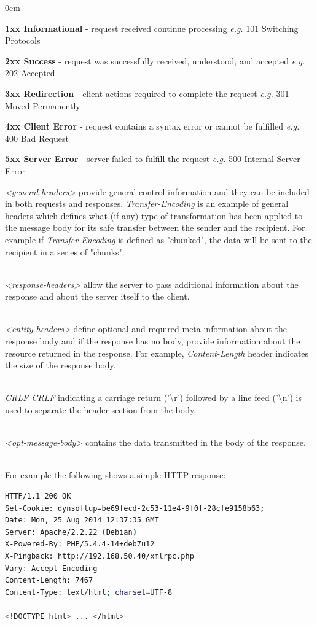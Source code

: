 \documentclass[a4paper,11pt,twoside]{report}
\begin{document}
\begin{list}{-}{}
\itemsep0em
\item \textbf{1xx Informational} - request received continue processing \textit{e.g.} 101 Switching Protocols
\item \textbf{2xx Success} - request was successfully received, understood, and accepted \textit{e.g.} 202 Accepted
\item \textbf{3xx Redirection} - client actions required to complete the request \textit{e.g.} 301 Moved Permanently
\item \textbf{4xx Client Error} - request contains a syntax error or cannot be fulfilled \textit{e.g.} 400 Bad Request
\item \textbf{5xx Server Error} - server failed to fulfill the request \textit{e.g.} 500 Internal Server Error
\end{list}
\noindent
\textit{<general-headers>} provide general control information and they can be included in both requests and responses. \textit{Transfer-Encoding} is an example of general headers which defines what (if any) type of transformation has been applied to the message body for its safe transfer between the sender and the recipient. For example if \textit{Transfer-Encoding} is defined as "chunked", the data will be sent to the recipient in a series of "chunks". 

\noindent\\
\textit{<response-headers>} allow the server to pass additional information about the response and about the server itself to the client. 

\noindent\\
\textit{<entity-headers>} define optional and required meta-information about the response body and if the response has no body, provide information about the resource returned in the response. For example, \textit{Content-Length} header indicates the size of the response body. 

\noindent\\
\textit{CRLF CRLF} indicating a carriage return ('\textbackslash r') followed by a line feed ('\textbackslash n') is used to separate the header section from the body. 

\noindent\\
\textit{<opt-message-body>} contains the data transmitted in the body of the response.

\noindent\\
For example the following shows a simple HTTP response:
\indent
\begin{lstlisting}[language=bash,xleftmargin=.25in,xrightmargin=.25in]
HTTP/1.1 200 OK
Set-Cookie: dynsoftup=be69fecd-2c53-11e4-9f0f-28cfe9158b63;
Date: Mon, 25 Aug 2014 12:37:35 GMT
Server: Apache/2.2.22 (Debian)
X-Powered-By: PHP/5.4.4-14+deb7u12
X-Pingback: http://192.168.50.40/xmlrpc.php
Vary: Accept-Encoding
Content-Length: 7467
Content-Type: text/html; charset=UTF-8

<!DOCTYPE html> ... </html>
\end{lstlisting} 
\end{document}
